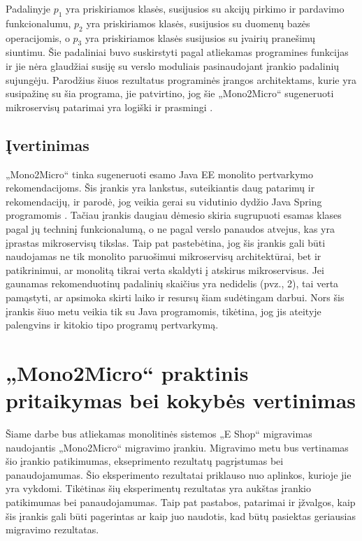 \documentclass{VUMIFPSbakalaurinis}
\begin{document}
Padalinyje $p_{1}$ yra priskiriamos klasės, susijusios su akcijų pirkimo ir pardavimo funkcionalumu, $p_{2}$ yra priskiriamos klasės, susijusios su duomenų bazės operacijomis, o $p_{3}$ yra priskiriamos klasės susijusios su įvairių pranešimų siuntimu. Šie padaliniai buvo suskirstyti pagal atliekamas programines funkcijas ir jie nėra glaudžiai susiję su verslo moduliais pasinaudojant įrankio padalinių sujungėju. Parodžius šiuos rezultatus programinės įrangos architektams, kurie yra susipažinę su šia programa, jie patvirtino, jog šie „Mono2Micro“ sugeneruoti mikroservisų patarimai yra logiški ir prasmingi \cite{KXL+20}.\\

\subsection{Įvertinimas}
„Mono2Micro“ tinka sugeneruoti esamo Java EE monolito pertvarkymo rekomendacijoms. Šis įrankis yra lankstus, suteikiantis daug patarimų ir rekomendacijų, ir parodė, jog veikia gerai su vidutinio dydžio Java Spring programomis \cite{San21}. Tačiau įrankis daugiau dėmesio skiria sugrupuoti esamas klases pagal jų techninį funkcionalumą, o ne pagal verslo panaudos atvejus, kas yra įprastas mikroservisų tikslas. Taip pat pastebėtina, jog šis įrankis gali būti naudojamas ne tik monolito paruošimui mikroservisų architektūrai, bet ir patikrinimui, ar monolitą tikrai verta skaldyti į atskirus mikroservisus. Jei gaunamas rekomenduotinų padalinių skaičius yra nedidelis (pvz., 2), tai verta pamąstyti, ar apsimoka skirti laiko ir resursų šiam sudėtingam darbui. Nors šis įrankis šiuo metu veikia tik su Java programomis, tikėtina, jog jis ateityje palengvins ir kitokio tipo programų pertvarkymą.

\section{„Mono2Micro“ praktinis pritaikymas bei kokybės vertinimas}
Šiame darbe bus atliekamas monolitinės sistemos „E Shop“ migravimas naudojantis „Mono2Micro“ migravimo įrankiu. Migravimo metu bus vertinamas šio įrankio patikimumas, ekseprimento rezultatų pagrįstumas bei panaudojamumas. Šio eksperimento rezultatai priklauso nuo aplinkos, kurioje jie yra vykdomi. Tikėtinas šių eksperimentų rezultatas yra aukštas įrankio patikimumas bei panaudojamumas. Taip pat pastabos, patarimai ir įžvalgos, kaip šis įrankis gali būti pagerintas ar kaip juo naudotis, kad būtų pasiektas geriausias migravimo rezultatas.
\end{document}
